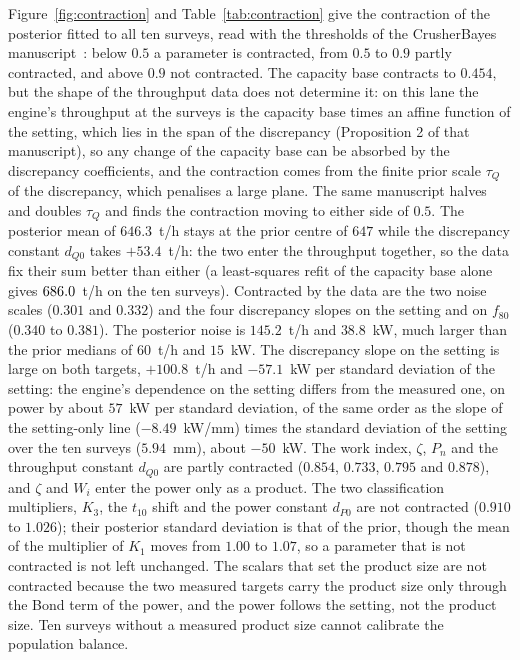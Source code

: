 Figure~\ref{fig:contraction} and Table~\ref{tab:contraction} give the contraction of the posterior fitted to all ten surveys, read with the
thresholds of the CrusherBayes manuscript~\cite{crusherbayes2026}: below $0.5$ a parameter is contracted, from $0.5$ to $0.9$ partly
contracted, and above $0.9$ not contracted. The capacity base contracts to $0.454$, but the shape of the throughput data does not determine it:
on this lane the engine's throughput at the surveys is the capacity base times an affine function of the setting, which lies in the span of the
discrepancy (Proposition 2 of that manuscript), so any change of the capacity base can be absorbed by the discrepancy coefficients, and the
contraction comes from the finite prior scale $\tau_Q$ of the discrepancy, which penalises a large plane. The same manuscript halves and doubles
$\tau_Q$ and finds the contraction moving to either side of $0.5$. The posterior mean of $646.3$~t/h stays at the prior centre of $647$ while
the discrepancy constant $d_{Q0}$ takes $+53.4$~t/h: the two enter the throughput together, so the data fix their sum better than either (a
least-squares refit of the capacity base alone gives $686.0$~t/h on the ten surveys). Contracted by the data are the two noise scales ($0.301$ and
$0.332$) and the four discrepancy slopes on the setting and on $f_{80}$ ($0.340$ to $0.381$). The posterior noise is $145.2$~t/h and $38.8$~kW, much larger than the prior
medians of $60$~t/h and $15$~kW. The discrepancy slope on the setting is large on both targets, $+100.8$~t/h and $-57.1$~kW per standard deviation of the
setting: the engine's dependence on the setting differs from the measured one, on power by about $57$~kW per standard deviation, of the same order as the
slope of the setting-only line ($-8.49$~kW/mm) times the standard deviation of the setting over the ten surveys ($5.94$~mm), about $-50$~kW. The work index, $\zeta$, $P_n$ and the throughput constant $d_{Q0}$ are partly contracted ($0.854$,
$0.733$, $0.795$ and $0.878$), and $\zeta$ and $W_i$ enter the power only as a product. The two classification multipliers, $K_3$, the $t_{10}$ shift
and the power constant $d_{P0}$ are not contracted ($0.910$ to $1.026$); their posterior standard deviation is that of the prior, though the mean of
the multiplier of $K_1$ moves from $1.00$ to $1.07$, so a parameter that is not contracted is not left unchanged. The scalars that set the product size are not
contracted because the two measured targets carry the product size only through the Bond term of the power, and the power follows the setting, not
the product size. Ten surveys without a measured product size cannot calibrate the
population balance.


